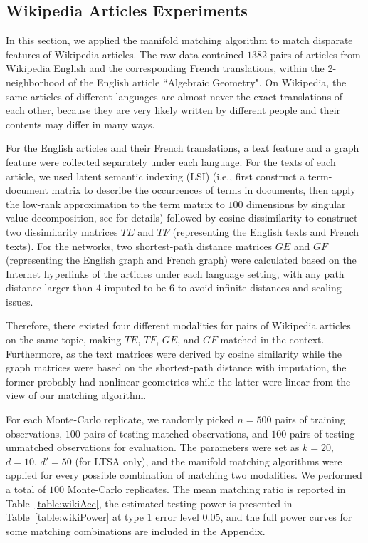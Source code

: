 \documentclass[times,twocolumn,final]{elsarticle}
\begin{document}
\subsection{Wikipedia Articles Experiments}
\label{wikiReal}
In this section, we applied the manifold matching algorithm to match disparate features of Wikipedia articles. The raw data contained $1382$ pairs of articles from Wikipedia English and the corresponding French translations, within the 2-neighborhood of the English article ``Algebraic Geometry". On Wikipedia, the same articles of different languages are almost never the exact translations of each other, because they are very likely written by different people and their contents may differ in many ways.

For the English articles and their French translations, a text feature and a graph feature were collected separately under each language. For the texts of each article, we used latent semantic indexing (LSI) (i.e., first construct a term-document matrix to describe the occurrences of terms in documents, then apply the low-rank approximation to the term matrix to $100$ dimensions by singular value decomposition, see \citep{DeerwesterDumais1990} for details) followed by cosine dissimilarity to construct two dissimilarity matrices $TE$ and $TF$ (representing the English texts and French texts). For the networks, two shortest-path distance matrices $GE$ and $GF$ (representing the English graph and French graph) were calculated based on the Internet hyperlinks of the articles under each language setting, with any path distance larger than $4$ imputed to be $6$ to avoid infinite distances and scaling issues.

Therefore, there existed four different modalities for pairs of Wikipedia articles on the same topic, making $TE$, $TF$, $GE$, and $GF$ matched in the context. Furthermore, as the text matrices were derived by cosine similarity while the graph matrices were based on the shortest-path distance with imputation, the former probably had nonlinear geometries while the latter were linear from the view of our matching algorithm.

For each Monte-Carlo replicate, we randomly picked $n=500$ pairs of training observations, $100$ pairs of testing matched observations, and $100$ pairs of testing unmatched observations for evaluation. The parameters were set as $k=20$, $d=10$, $d'=50$ (for LTSA only), and the manifold matching algorithms were applied for every possible combination of matching two modalities. We performed a total of $100$ Monte-Carlo replicates. The mean matching ratio is reported in Table~\ref{table:wikiAcc}, the estimated testing power is presented in Table~\ref{table:wikiPower} at type $1$ error level $0.05$, and the full power curves for some matching combinations are included in the Appendix. 
\end{document}
